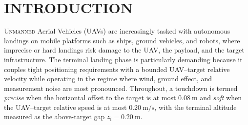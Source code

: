 \documentclass{IEEEtaes}
\begin{document}

\section{INTRODUCTION}
U{\scshape nmanned} Aerial Vehicles (UAVs) are increasingly tasked with autonomous landings on mobile platforms such as ships, ground vehicles, and robots, where imprecise or hard landings risk damage to the UAV, the payload, and the target infrastructure. The terminal landing phase is particularly demanding because it couples tight positioning requirements with a bounded UAV--target relative velocity while operating in the regime where wind, ground effect, and measurement noise are most pronounced. Throughout, a touchdown is termed \emph{precise} when the horizontal offset to the target is at most $0.08~\text{m}$ and \emph{soft} when the UAV--target relative speed is at most $0.20~\text{m/s}$, with the terminal altitude measured as the above-target gap $z_\text{f}=0.20~\text{m}$.
\end{document}
